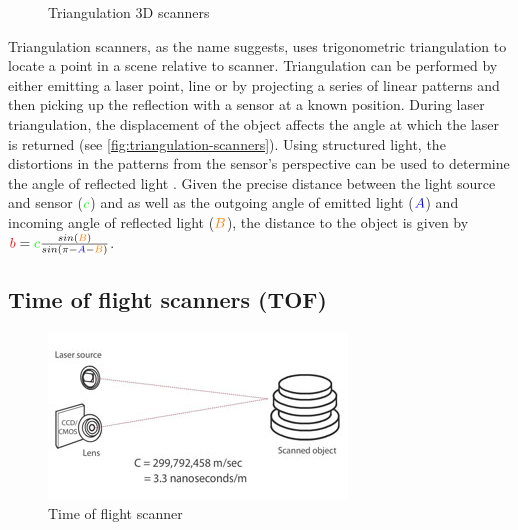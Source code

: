 \begin{figure}[H]
\begin{subfigure}[b]{.33\textwidth}
	\end{subfigure}
	\caption{Triangulation 3D scanners}
	\label{fig:triangulation-scanners}
\end{figure}

Triangulation scanners, as the name suggests, uses trigonometric triangulation to locate a point in a scene relative to scanner. Triangulation can be performed by either emitting a laser point, line or by projecting a series of linear patterns and then picking up the reflection with a sensor at a known position. During laser triangulation, the displacement of the object affects the angle at which the laser is returned (see \autoref{fig:triangulation-scanners}). Using structured light, the distortions in the patterns from the sensor's perspective can be used to determine the angle of reflected light \cite{Brown2012}. Given the precise distance between the light source and sensor ($\begingroup\color{green}c\endgroup$) and as well as the outgoing angle of emitted light ($\begingroup\color{blue}A\endgroup$) and incoming angle of reflected light ($\begingroup\color{orange}B\endgroup$), the distance to the object is given by $\begingroup\color{red}b\endgroup = \begingroup\color{green}c\endgroup\frac{ sin(\begingroup\color{orange}B\endgroup)}{sin(\pi - \begingroup\color{blue}A\endgroup-\begingroup\color{orange}B\endgroup)}$.

\subsection{Time of flight scanners (TOF)}

\begin{figure}[ht]
  \centering
  \includegraphics[width=.5\linewidth]{images/pulse-tof}
  \caption{Time of flight scanner}
  \label{fig:tof}
\end{figure}

